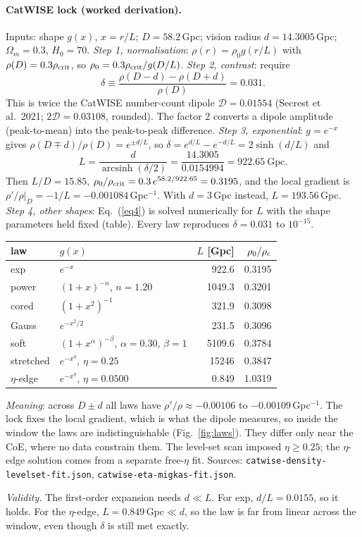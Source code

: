 \documentclass[10pt,twocolumn]{article}
\newcommand{\why}[1]{\par\noindent\textit{Validity.} #1\par}
\begin{document}
\paragraph{CatWISE lock (worked derivation).} Inputs: shape $g(x)$, $x=r/L$; $D=58.2$\,Gpc; vision radius $d=14.3005$\,Gpc; $\Omega_m=0.3$, $H_0=70$. \emph{Step 1, normalisation}: $\rho(r)=\rho_0g(r/L)$ with $\rho(D)=0.3\rho_{\rm crit}$, so $\rho_0=0.3\rho_{\rm crit}/g(D/L)$. \emph{Step 2, contrast}: require
\begin{equation}\label{eq4}
\delta\equiv\frac{\rho(D-d)-\rho(D+d)}{\rho(D)}=0.031 .
\end{equation}
This is twice the CatWISE number-count dipole $\mathcal D=0.01554$ (Secrest et al.\ 2021; $2\mathcal D=0.03108$, rounded). The factor 2 converts a dipole amplitude (peak-to-mean) into the peak-to-peak difference. \emph{Step 3, exponential}: $g=e^{-x}$ gives $\rho(D\mp d)/\rho(D)=e^{\pm d/L}$, so $\delta=e^{d/L}-e^{-d/L}=2\sinh(d/L)$ and
\begin{equation}\label{eq5}
L=\frac{d}{\operatorname{arcsinh}(\delta/2)}=\frac{14.3005}{0.0154994}=922.65\ \text{Gpc}.
\end{equation}
Then $L/D=15.85$, $\rho_0/\rho_{\rm crit}=0.3\,e^{58.2/922.65}=0.3195$, and the local gradient is $\rho'/\rho|_D=-1/L=-0.001084$\,Gpc$^{-1}$. With $d=3$\,Gpc instead, $L=193.56$\,Gpc. \emph{Step 4, other shapes}: Eq.~(\ref{eq4}) is solved numerically for $L$ with the shape parameters held fixed (table). Every law reproduces $\delta=0.031$ to $10^{-15}$.
\begin{center}\small\begin{tabular}{@{}llrr@{}}
law & $g(x)$ & $L$ [Gpc] & $\rho_0/\rho_{\rm c}$\\\hline
exp & $e^{-x}$ & 922.6 & 0.3195\\
power & $(1+x)^{-n}$, $n{=}1.20$ & 1049.3 & 0.3201\\
cored & $(1+x^2)^{-1}$ & 321.9 & 0.3098\\
Gauss & $e^{-x^2/2}$ & 231.5 & 0.3096\\
soft & $(1+x^{\alpha})^{-\beta}$, $\alpha{=}0.30$, $\beta{=}1$ & 5109.6 & 0.3784\\
stretched & $e^{-x^{\eta}}$, $\eta{=}0.25$ & 15246 & 0.3847\\
$\eta$-edge & $e^{-x^{\eta}}$, $\eta{=}0.0500$ & 0.849 & 1.0319\\
\end{tabular}\end{center}
\emph{Meaning}: across $D\pm d$ all laws have $\rho'/\rho\approx-0.00106$ to $-0.00109$\,Gpc$^{-1}$. The lock fixes the local gradient, which is what the dipole measures, so inside the window the laws are indistinguishable (Fig.~\ref{fig:laws}). They differ only near the CoE, where no data constrain them. The level-set scan imposed $\eta\ge0.25$; the $\eta$-edge solution comes from a separate free-$\eta$ fit. Sources: \texttt{catwise-density-levelset-fit.json}, \texttt{catwise-eta-migkas-fit.json}.
\why{The first-order expansion needs $d\ll L$. For exp, $d/L=0.0155$, so it holds. For the $\eta$-edge, $L=0.849$\,Gpc$\ll d$, so the law is far from linear across the window, even though $\delta$ is still met exactly.}
\end{document}
